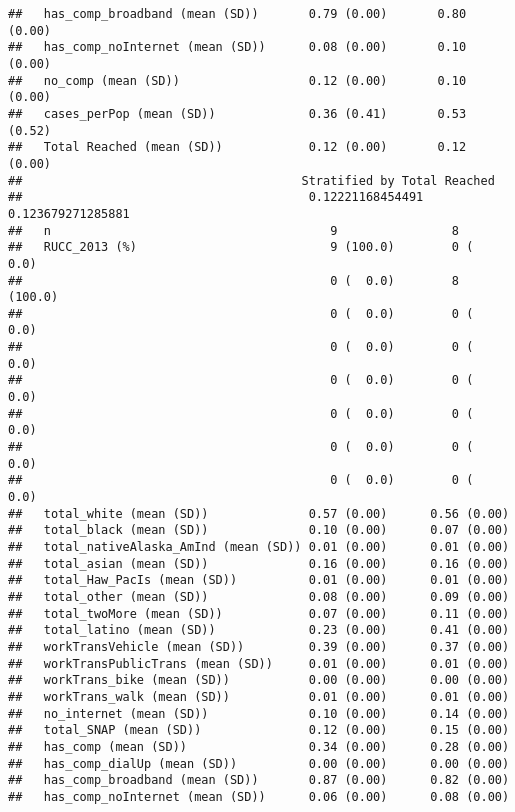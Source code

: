 \documentclass[
]{article}
\begin{document}
\begin{verbatim}
##   has_comp_broadband (mean (SD))       0.79 (0.00)       0.80 (0.00)      
##   has_comp_noInternet (mean (SD))      0.08 (0.00)       0.10 (0.00)      
##   no_comp (mean (SD))                  0.12 (0.00)       0.10 (0.00)      
##   cases_perPop (mean (SD))             0.36 (0.41)       0.53 (0.52)      
##   Total Reached (mean (SD))            0.12 (0.00)       0.12 (0.00)      
##                                       Stratified by Total Reached
##                                        0.12221168454491 0.123679271285881
##   n                                       9                8             
##   RUCC_2013 (%)                           9 (100.0)        0 (  0.0)     
##                                           0 (  0.0)        8 (100.0)     
##                                           0 (  0.0)        0 (  0.0)     
##                                           0 (  0.0)        0 (  0.0)     
##                                           0 (  0.0)        0 (  0.0)     
##                                           0 (  0.0)        0 (  0.0)     
##                                           0 (  0.0)        0 (  0.0)     
##                                           0 (  0.0)        0 (  0.0)     
##   total_white (mean (SD))              0.57 (0.00)      0.56 (0.00)      
##   total_black (mean (SD))              0.10 (0.00)      0.07 (0.00)      
##   total_nativeAlaska_AmInd (mean (SD)) 0.01 (0.00)      0.01 (0.00)      
##   total_asian (mean (SD))              0.16 (0.00)      0.16 (0.00)      
##   total_Haw_PacIs (mean (SD))          0.01 (0.00)      0.01 (0.00)      
##   total_other (mean (SD))              0.08 (0.00)      0.09 (0.00)      
##   total_twoMore (mean (SD))            0.07 (0.00)      0.11 (0.00)      
##   total_latino (mean (SD))             0.23 (0.00)      0.41 (0.00)      
##   workTransVehicle (mean (SD))         0.39 (0.00)      0.37 (0.00)      
##   workTransPublicTrans (mean (SD))     0.01 (0.00)      0.01 (0.00)      
##   workTrans_bike (mean (SD))           0.00 (0.00)      0.00 (0.00)      
##   workTrans_walk (mean (SD))           0.01 (0.00)      0.01 (0.00)      
##   no_internet (mean (SD))              0.10 (0.00)      0.14 (0.00)      
##   total_SNAP (mean (SD))               0.12 (0.00)      0.15 (0.00)      
##   has_comp (mean (SD))                 0.34 (0.00)      0.28 (0.00)      
##   has_comp_dialUp (mean (SD))          0.00 (0.00)      0.00 (0.00)      
##   has_comp_broadband (mean (SD))       0.87 (0.00)      0.82 (0.00)      
##   has_comp_noInternet (mean (SD))      0.06 (0.00)      0.08 (0.00)      

\end{verbatim}
\end{document}
